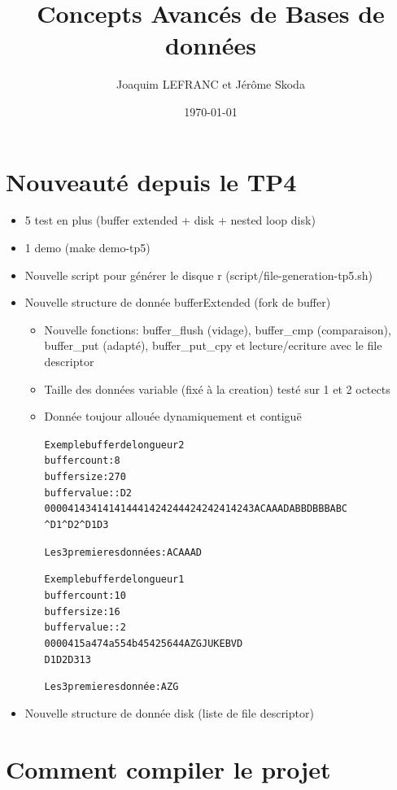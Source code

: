 \documentclass[a4paper]{article}
\title{Concepts Avancés de Bases de données}
\author{Joaquim LEFRANC et Jérôme Skoda}
\date{\today}
\begin{document}
\maketitle


\section{Nouveauté depuis le TP4}

\begin{itemize}
  \item 5 test en plus (buffer extended + disk + nested loop disk)
  \item 1 demo (make demo-tp5)
  \item Nouvelle script pour générer le disque r (script/file-generation-tp5.sh)
  \item Nouvelle structure de donnée bufferExtended (fork de buffer)
    \begin{itemize}
      \item Nouvelle fonctions: buffer\_flush (vidage), buffer\_cmp (comparaison), 
         buffer\_put (adapté), buffer\_put\_cpy et lecture/ecriture avec le file descriptor
      \item Taille des données variable (fixé à la creation) testé sur 1 et 2 octects
      \item Donnée toujour allouée dynamiquement et contiguë 
         \begin{alltt}
Exemple buffer de longueur 2
buffer count: 8
buffer size: 270
buffer value::                                             D2
  0000  41 43 41 41 41 44 41 42 42 44 42 42 42 41 42 43  ACAAADABBDBBBABC
       ^ D1  ^  D2 ^                                     D1  D3          

Les 3 premieres données: AC AA AD

Exemple buffer de longueur 1
buffer count: 10
buffer size: 16
buffer value::                                            2
  0000  41 5a 47 4a 55 4b 45 42 56 44                    AZGJUKEBVD
        D1 D2 D3                                         1 3
       
Les 3 premieres donnée: A Z G
\end{alltt}
    \end{itemize}
  \item Nouvelle structure de donnée disk (liste de file descriptor)
\end{itemize}

\section{Comment compiler le projet}
\end{document}
